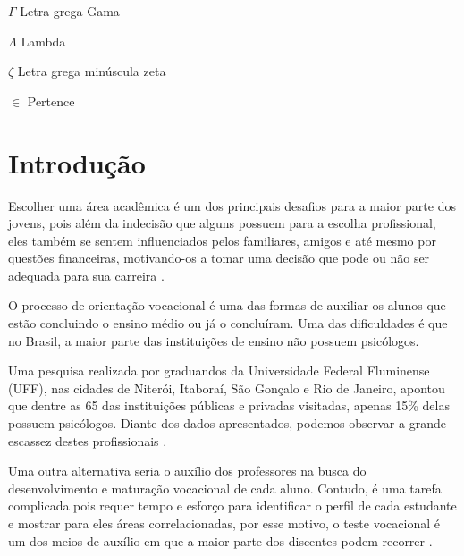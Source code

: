 \documentclass[
	12pt,				%
    oneside,			%
	a4paper,			%
	english,			%
	french,				%
	spanish,			%
	brazil,				%
	]{abntex2}
\begin{document}
\begin{simbolos}
  \item[$ \Gamma $] Letra grega Gama
  \item[$ \Lambda $] Lambda
  \item[$ \zeta $] Letra grega minúscula zeta
  \item[$ \in $] Pertence
\end{simbolos}


\tableofcontents*


\textual


\chapter{Introdução} %

Escolher uma área acadêmica é um dos principais desafios para a maior parte dos jovens, pois além da indecisão que alguns possuem para a escolha profissional, eles também se sentem influenciados pelos familiares, amigos e até mesmo por questões financeiras, motivando-os a tomar uma decisão que pode ou não ser adequada para sua carreira \cite{goncalves}.

O processo de orientação vocacional é uma das formas de auxiliar os alunos que estão concluindo o ensino médio ou já o concluíram. Uma das dificuldades é que no Brasil, a maior parte das instituições de ensino não possuem psicólogos.

Uma pesquisa realizada por graduandos da Universidade Federal Fluminense (UFF), nas cidades de Niterói, Itaboraí, São Gonçalo e Rio de Janeiro, apontou que dentre as 65 das instituições públicas e privadas visitadas, apenas 15\% delas possuem psicólogos. Diante dos dados apresentados, podemos observar a grande escassez destes profissionais \cite{arreguy}.

Uma outra alternativa seria o auxílio dos professores na busca do desenvolvimento e maturação vocacional de cada aluno. Contudo, é uma tarefa complicada pois requer tempo e esforço para identificar o perfil de cada estudante e mostrar para eles áreas correlacionadas, por esse motivo, o teste vocacional é um dos meios de auxílio em que a maior parte dos discentes podem recorrer \cite{marielsom}.
\end{document}
